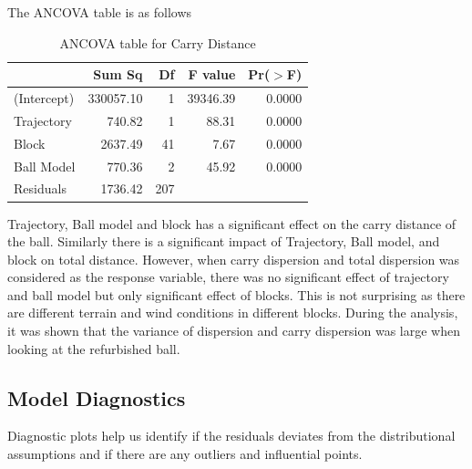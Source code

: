 \documentclass{article}\usepackage[]{graphicx}\usepackage[]{color}
\begin{document}
The ANCOVA table is as follows

\begin{table}[ht]
\centering
\begin{tabular}{|l|rrrr|}
  \hline
 & Sum Sq & Df & F value & Pr($>$F) \\ 
  \hline
(Intercept) & 330057.10 & 1 & 39346.39 & 0.0000 \\ 
  Trajectory & 740.82 & 1 & 88.31 & 0.0000 \\ 
  Block & 2637.49 & 41 & 7.67 & 0.0000 \\ 
  Ball Model & 770.36 & 2 & 45.92 & 0.0000 \\ 
  Residuals & 1736.42 & 207 &  &  \\ 
   \hline
\end{tabular}
\caption{ANCOVA table for Carry Distance}
\end{table}

\bigskip

\bigskip

Trajectory, Ball model and block has a significant effect on the carry distance of the ball. Similarly there is a significant impact of Trajectory, Ball model, and block on total distance. However, when carry dispersion and total dispersion was considered as the response variable, there was no significant effect of trajectory and ball model but only significant effect of blocks. This is not surprising as there are different terrain and wind conditions in different blocks. During the analysis, it was shown that the variance of dispersion and carry dispersion was large when looking at the refurbished ball. 

\subsection*{Model Diagnostics}

Diagnostic plots help us identify if the residuals deviates from the distributional assumptions and if there are any outliers and influential points.  
\end{document}

